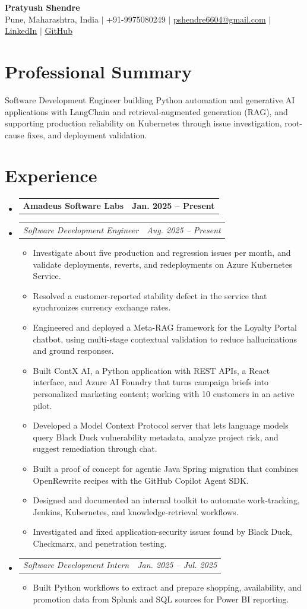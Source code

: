 \documentclass[a4paper,11pt]{article}
\makeatletter
\newcommand{\bulletpoint}[1]{\item\small{#1}}
\newcommand{\company}[2]{\item\begin{tabularx}{\textwidth}{@{}Xr@{}}\textbf{#1}& \textbf{#2}\end{tabularx}\vspace{-4pt}}
\newcommand{\role}[2]{\item\begin{tabularx}{\textwidth}{@{}Xr@{}}\textit{\small #1}&\textit{\small #2}\end{tabularx}\vspace{-5pt}}
\makeatother
\begin{document}
\begin{center}
  {\Large\bfseries Pratyush Shendre}\\[2pt]
  \small Pune, Maharashtra, India $|$ +91-9975080249 $|$
  \href{mailto:pshendre6604@gmail.com}{pshendre6604@gmail.com} $|$
  \href{https://www.linkedin.com/in/pratyush-shendre-2256a7223/}{\underline{LinkedIn}} $|$
  \href{https://github.com/PratyushS04}{\underline{GitHub}}
\end{center}

\section{Professional Summary}
\small Software Development Engineer building Python automation and generative AI applications with LangChain and retrieval-augmented generation (RAG), and supporting production reliability on Kubernetes through issue investigation, root-cause f{}ixes, and deployment validation.

\section{Experience}
\begin{itemize}[leftmargin=0in,label={}]
  \company{Amadeus Software Labs}{Jan. 2025 -- Present}
  \role{Software Development Engineer}{Aug. 2025 -- Present}
  \begin{itemize}
    \bulletpoint{Investigate about f{}ive production and regression issues per month, and validate deployments, reverts, and redeployments on Azure Kubernetes Service.}
    \bulletpoint{Resolved a customer-reported stability defect in the service that synchronizes currency exchange rates.}
    \bulletpoint{Engineered and deployed a Meta-RAG framework for the Loyalty Portal chatbot, using multi-stage contextual validation to reduce hallucinations and ground responses.}
    \bulletpoint{Built ContX AI, a Python application with REST APIs, a React interface, and Azure AI Foundry that turns campaign briefs into personalized marketing content; working with 10 customers in an active pilot.}
    \bulletpoint{Developed a Model Context Protocol server that lets language models query Black Duck vulnerability metadata, analyze project risk, and suggest remediation through chat.}
    \bulletpoint{Built a proof of concept for agentic Java Spring migration that combines OpenRewrite recipes with the GitHub Copilot Agent SDK.}
    \bulletpoint{Designed and documented an internal toolkit to automate work-tracking, Jenkins, Kubernetes, and knowledge-retrieval workf{}lows.}
    \bulletpoint{Investigated and f{}ixed application-security issues found by Black Duck, Checkmarx, and penetration testing.}
  \end{itemize}
  \role{Software Development Intern}{Jan. 2025 -- Jul. 2025}
  \begin{itemize}
    \bulletpoint{Built Python workf{}lows to extract and prepare shopping, availability, and promotion data from Splunk and SQL sources for Power BI reporting.}
  \end{itemize}
\end{itemize}
\end{document}
